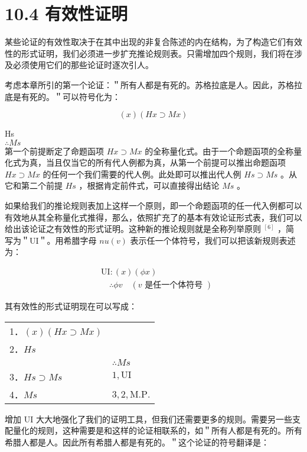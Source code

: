 \section*{10.4 有效性证明}
某些论证的有效性取决于在其中出现的非复合陈述的内在结构，为了构造它们有效性的形式证明，我们必须进一步扩充推论规则表。只需增加四个规则，我们将在涉及必须使用它们的那些论证时逐次引人。

考虑本章所引的第一个论证：＂所有人都是有死的。苏格拉底是人。因此，苏格拉底是有死的。＂可以符号化为：

$$
(x)(H x \supset M x)
$$

Hs\\
$\therefore M s$\\
第一个前提断定了命题函项 $H x \supset M x$ 的全称量化式。由于一个命题函项的全称量化式为真，当且仅当它的所有代人例都为真，从第一个前提可以推出命题函项 $H x \supset M x$ 的任何一个我们需要的代人例。此处即可以推出代人例 $H s \supset M s$ 。从它和第二个前提 $H s$ ，根据肯定前件式，可以直接得出结论 $M s$ 。

如果给我们的推论规则表加上这样一个原则，即一个命题函项的任一代入例都可以有效地从其全称量化式推得，那么，依照扩充了的基本有效论证形式表，我们可以给出该论证之有效性的形式证明。这种新的推论规则就是全称列举原则 ${ }^{[6]}$ ，简写为＂UI＂。用希腊字母 $n u(v)$ 表示任一个体符号，我们可以把该新规则表述为：

$$
\begin{aligned}
& \mathrm{UI}:(x)(\phi x) \\
& \quad \therefore \phi v \quad(v \text { 是任一个体符号 })
\end{aligned}
$$

其有效性的形式证明现在可以写成：

\begin{center}
\begin{tabular}{ll}
1．$(x)(H x \supset M x)$ &  \\
2．$H s$ &  \\
 & $\therefore M s$ \\
3．$H s \supset M s$ & $1, \mathrm{UI}$ \\
4．$M s$ & $3,2, \mathrm{M} . \mathrm{P}$. \\
\end{tabular}
\end{center}

增加 UI 大大地强化了我们的证明工具，但我们还需要更多的规则。需要另一些支配量化的规则，这种需要是和这样的论证相联系的，如＂所有人都是有死的。所有希腊人都是人。因此所有希腊人都是有死的。＂这个论证的符号翻译是：

